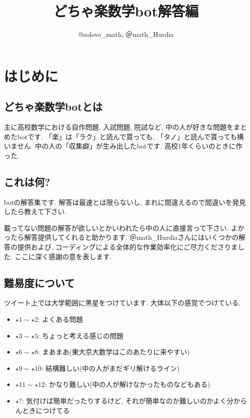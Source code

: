 \documentclass[twocolumn]{jsreport}
\begin{document}
\fontsize{9pt}{7pt}\selectfont
\lengthparam
\onecolumn


\begin{titlepage}
\title{どちゃ楽数学bot解答編}
\author{@solove\_math, ＠math\_Hurdia}
\maketitle
\onecolumn
\thispagestyle{empty}
\end{titlepage}

\tableofcontents
\clearpage

\chapter{はじめに}
\section{どちゃ楽数学botとは}
主に高校数学における自作問題, 入試問題, 院試など, 中の人が好きな問題をまとめたbotです.
「楽」は「ラク」と読んで貰っても, 「タノ」と読んで貰っても構いません. 中の人の「収集癖」が生み出したbotです. 高校1年くらいのときに作った.

\section{これは何?}
botの解答集です. 解答は最速とは限らないし, まれに間違えるので間違いを発見したら教えて下さい.\par
載ってない問題の解答が欲しいとかいわれたら中の人に直接言って下さい. よかったら解答提供してくれると助かります. ＠math\_Hurdiaさんにはいくつかの解答の提供および, コーディングによる全体的な作業効率化にご尽力くださりました. ここに深く感謝の意を表します.

\section{難易度について}
ツイート上では大学範囲に黒星をつけています. 大体以下の感覚でつけている.
\begin{itemize}
\item $\star 1 \sim \star 2$: よくある問題
\item $\star 3\sim \star 5$: ちょっと考える感じの問題
\item $\star 6 \sim \star 8$: まあまあ(東大京大数学はこのあたりに来やすい)
\item $\star 9 \sim \star 10$: 結構難しい(中の人がまだギリ解けるライン)
\item $\star 11 \sim \star 12$: かなり難しい(中の人が解けなかったものなどもある)
\item $\star ?$: 気付けば簡単だったりするけど, それが簡単なのか難しいのかよく分からんときにつけてる
\end{itemize}
\end{document}
